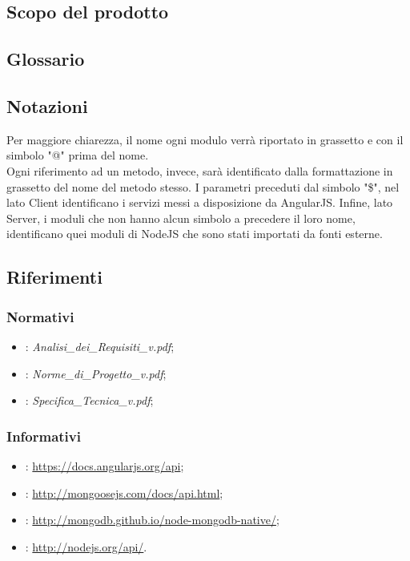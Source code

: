 \subsection{Scopo del prodotto}
\Prodotto{}

\subsection{Glossario}
\Glossario{}

\subsection{Notazioni}
Per maggiore chiarezza, il nome ogni modulo verrà riportato in grassetto e con il simbolo "@" prima del nome.\\
Ogni riferimento ad un metodo, invece, sarà identificato dalla formattazione in grassetto del nome del metodo stesso. 
I parametri preceduti dal simbolo "\$", nel lato Client identificano i servizi messi a disposizione da AngularJS. Infine, lato Server, i moduli che non hanno alcun simbolo a precedere il loro nome, identificano quei moduli di NodeJS che sono stati importati da fonti esterne.

\subsection{Riferimenti}

\subsubsection{Normativi}
\begin{itemize}
\item {}: \emph{Analisi\_{}dei\_{}Requisiti\_{}v\versioneAnalisiDeiRequisiti{}.pdf};
\item {}: \emph{Norme\_{}di\_{}Progetto\_{}v\versioneNormeDiProgetto{}.pdf};
\item {}: \emph{Specifica\_{}Tecnica\_{}v\versioneNormeDiProgetto{}.pdf};
\end{itemize}

\subsubsection{Informativi}
\begin{itemize}
\item {}: \url{https://docs.angularjs.org/api};
\item {}: \url{http://mongoosejs.com/docs/api.html};
\item {}: \url{http://mongodb.github.io/node-mongodb-native/};
\item {}: \url{http://nodejs.org/api/}.
\end{itemize}

